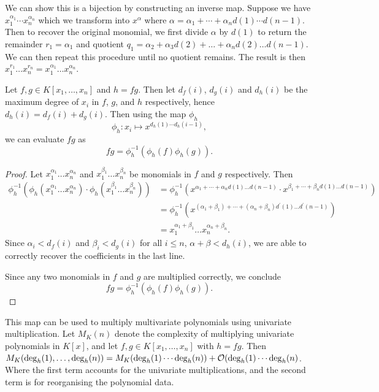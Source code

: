 We can show this is a bijection by constructing an inverse map. Suppose we have $x_1^{\alpha_1}\cdots x_n^{\alpha_n}$ which we transform into $x^\alpha$ where $\alpha = \alpha_1 + \cdots + \alpha_n d(1) \cdots d(n-1)$. Then to recover the original monomial, we first divide $\alpha$ by $d(1)$ to return the remainder $r_1 = \alpha_1$ and quotient $q_1 = \alpha_2 + \alpha_3 d(2) + \ldots + \alpha_n d(2) \ldots d(n-1)$. We can then repeat this procedure until no quotient remains. The result is then $x_1^{r_1} \ldots x_n^{r_n} = x_1^{\alpha_1} \ldots x_n^{\alpha_n}$.

\begin{proposition}
    Let $f, g \in K[x_1, \ldots, x_n]$ and $h = fg$. Then let $d_f(i)$, $d_g(i)$ and $d_h(i)$ be the maximum degree of $x_i$ in $f$, $g$, and $h$ respectively, hence $d_h(i) = d_f(i) + d_g(i)$. Then using the map $\phi_h$
    \[
        \phi_h: x_i \mapsto x^{d_h(1) \cdots d_h(i-1)},
    \]
    we can evaluate $fg$ as
    \[
        f g= \phi^{-1}_h(\phi_h(f) \phi_h(g)).
    \]
\end{proposition}

\begin{proof}
    Let $x_1^{\alpha_1}\ldots x_n^{\alpha_n}$ and $x_1^{\beta_1}\ldots x_n^{\beta_n}$ be monomials in $f$ and $g$ respectively. Then
    \begin{align*}
        \phi_h^{-1}(\phi_h(x_1^{\alpha_1}\ldots x_n^{\alpha_n}) \cdot \phi_h(x_1^{\beta_1}\ldots x_n^{\beta_n}))
        &= \phi_h^{-1}(x^{\alpha_1 + \cdots  + \alpha_n d(1) \ldots d(n-1)} \cdot x^{\beta_1 + \cdots + \beta_n d(1) \ldots d(n-1)})\\
        &= \phi_h^{-1}(x^{(\alpha_1 + \beta_1) + \cdots + (\alpha_n + \beta_n)d^\prime(1) \ldots d^\prime(n-1)})\\
        &= x_1^{\alpha_1 + \beta_1} \ldots x_n^{\alpha_n + \beta_n}.
    \end{align*}
    Since $\alpha_i < d_f(i)$ and $\beta_i < d_g(i)$ for all $i \le n$, $\alpha + \beta < d_h(i)$, we are able to correctly recover the coefficients in the last line.

    Since any two monomials in $f$ and $g$ are multiplied correctly, we conclude
    \[
        f g= \phi^{-1}_h(\phi_h(f) \phi_h(g)).
    \]
\end{proof}

This map can be used to multiply multivariate polynomials using univariate multiplication. Let $M_K(n)$ denote the complexity of multiplying univariate polynomials in $K[x]$, and let $f, g \in K[x_1, \ldots, x_n]$ with $h = fg$. Then $M_K(\deg_h(1), \ldots, \deg_h(n)) = M_K(\deg_h(1) \cdots \deg_h (n)) + \mathcal O(\deg_h(1) \cdots \deg_h(n)$. Where the first term accounts for the univariate multiplications, and the second term is for reorganising the polynomial data.


